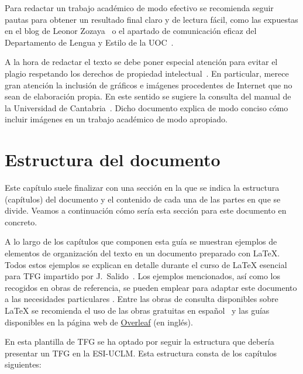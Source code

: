 Para redactar un trabajo académico de modo efectivo se recomienda seguir pautas para obtener un resultado final claro y de lectura fácil, como las expuestas en el blog de Leonor Zozaya~\cite{zozaya17} o el apartado de comunicación eficaz del Departamento de Lengua y Estilo de la UOC~\cite{uoc}.

A la hora de redactar el texto se debe poner especial atención para evitar el plagio respetando los derechos de propiedad intelectual~\cite{uc3m21}. En particular, merece gran atención la inclusión de gráficos e imágenes procedentes de Internet que no sean de elaboración propia. En este sentido se sugiere la consulta del manual de la Universidad de Cantabria~\cite{unican18}. Dicho documento explica de modo conciso cómo incluir imágenes en un trabajo académico de modo apropiado.



\section{Estructura del documento}
Este capítulo suele finalizar con una sección en la que se indica la estructura (capítulos) del documento y el contenido de cada una de las partes en que se divide. Veamos a continuación cómo sería esta sección para este documento en concreto.

A lo largo de los capítulos que componen esta guía se muestran ejemplos de elementos de organización del texto en un documento preparado con \LaTeX{}. Todos estos ejemplos se explican en detalle durante el curso de \LaTeX{} esencial para TFG impartido por J.~Salido~\cite{salido10}. Los ejemplos mencionados, así como los recogidos en obras de referencia, se pueden emplear para adaptar este documento a las necesidades particulares  \cite{lamport94,wikibookLaTex10}. Entre las obras de consulta disponibles sobre \LaTeX{} se recomienda el uso de las obras gratuitas en español~\cite{oetiker14,borbon21} y las guías disponibles en la página web de \href{https://es.overleaf.com/learn}{Overleaf} (en inglés).

En esta plantilla de TFG se ha optado por seguir la estructura que debería presentar un TFG en la \mbox{ESI-UCLM}. Esta estructura consta de los capítulos siguientes:

